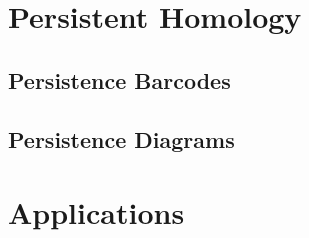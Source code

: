 \section{Persistent Homology}\label{sec:persistent-homology}

\subsection{Persistence Barcodes}

\subsection{Persistence Diagrams}

\section{Applications}\label{sec:applications}

\newpage





